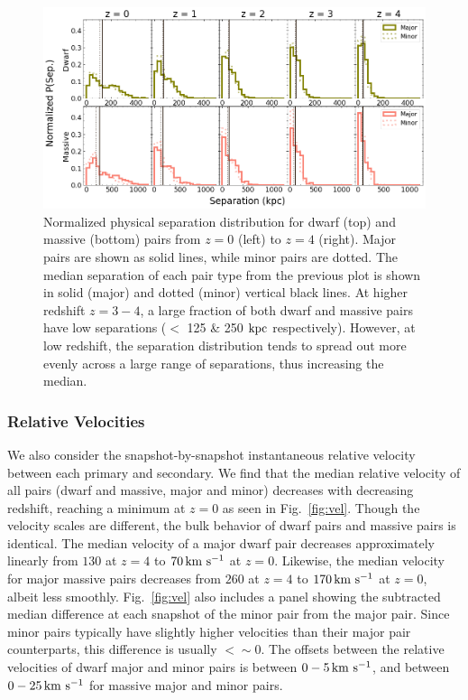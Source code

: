 \documentclass[twocolumn]{aastex631}
\begin{document}
\begin{figure}[htp]
  \centering
  \includegraphics[width=\textwidth]{separation_distribution_1000.png}
  \caption{Normalized physical separation distribution for dwarf (top) and massive (bottom) pairs from $z=0$ (left) to $z=4$ (right). Major pairs are shown as solid lines, while minor pairs are dotted. The median separation of each pair type from the previous plot is shown in solid (major) and dotted (minor) vertical black lines. 
  At higher redshift $z=3-4$, a large fraction of both dwarf and massive pairs have low separations ($<$ 125 \& 250 $\mathrm{kpc}$ respectively). However, at low redshift, the separation distribution tends to spread out more evenly across a large range of separations, thus increasing the median.
    }
  \label{fig:sep-dist}
\end{figure}


\subsubsection{Relative Velocities}
We also consider the snapshot-by-snapshot instantaneous relative velocity between each primary and secondary.
We find that the median relative velocity of all pairs (dwarf and massive, major and minor) decreases with decreasing redshift, reaching a minimum at $z=0$ as seen in Fig.~\ref{fig:vel}. 
Though the velocity scales are different, the bulk behavior of dwarf pairs and massive pairs is identical. 
\linebreak
The median velocity of a major dwarf pair decreases approximately linearly from $130$ at $z=4$ to $70\,\mathrm{km}~\mathrm{s}^{-1}$ at $z=0$. Likewise, the median velocity for major massive pairs decreases from $260$ at $z=4$ to $170\,\mathrm{km}~\mathrm{s}^{-1}$ at $z=0$, albeit less smoothly. 
Fig.~\ref{fig:vel} also includes a panel showing the subtracted median difference at each snapshot of the minor pair from the major pair. Since minor pairs typically have slightly higher velocities than their major pair counterparts, this difference is usually $<\sim0$. The offsets between the relative velocities of dwarf major and minor pairs is between $0-5\,\mathrm{km}~\mathrm{s}^{-1}$, and between $0-25\,\mathrm{km}~\mathrm{s}^{-1}$ for massive major and minor pairs.
\end{document}
